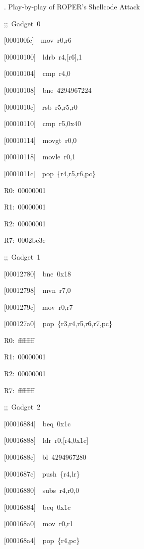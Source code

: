 \documentclass[9pt]{beamer}
\newcommand{\Gap} { \\ \pause \vspace{8pt} }
\begin{document}
\begin{frame}{\theframenumber. Play-by-play of ROPER's Shellcode Attack}
\begin{multicols}{3}
\tiny
{\color{title};;~Gadget~0}

[000100fc]~~mov~r0,r6

[00010100]~~ldrb~r4,[r6],1

[00010104]~~cmp~r4,0

[00010108]~~bne~4294967224

[0001010c]~~rsb~r5,r5,r0

[00010110]~~cmp~r5,0x40

[00010114]~~movgt~r0,0

[00010118]~~movle~r0,1

[0001011c]~~pop~\{r4,r5,r6,pc\}
\vspace{4pt}

R0:~00000001

R1:~00000001

R2:~00000001

R7:~0002bc3e
\Gap

{\color{title};;~Gadget~1}

[00012780]~~bne~0x18

[00012798]~~mvn~r7,0

[0001279c]~~mov~r0,r7

[000127a0]~~pop~\{r3,r4,r5,r6,r7,pc\}
\vspace{4pt}

R0:~ffffffff

R1:~00000001

R2:~00000001

R7:~ffffffff
\Gap
\columnbreak


{\color{title};;~Gadget~2}

[00016884]~~beq~0x1c

[00016888]~~ldr~r0,[r4,0x1c]



\alert<@+|+> {[0001688c]~~bl~4294967280}

\alert<@+|+> {[0001687c]~~push~\{r4,lr\}}

[00016880]~~subs~r4,r0,0

[00016884]~~beq~0x1c

[000168a0]~~mov~r0,r1

[000168a4]~~pop~\{r4,pc\}
\vspace{4pt}



\end{multicols}
\end{frame}
\end{document}
